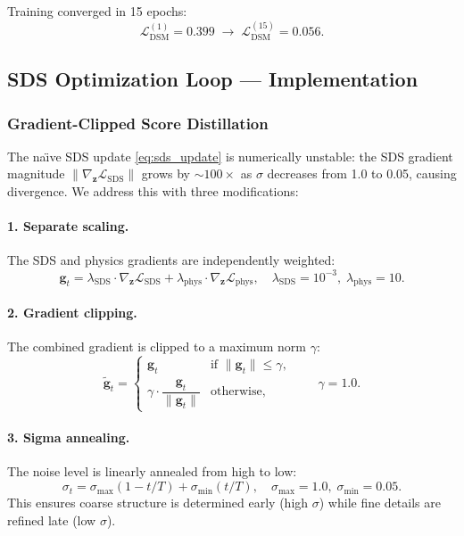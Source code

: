 \documentclass[12pt,a4paper]{article}
\newcommand{\loss}{\mathcal{L}}
\newcommand{\zvec}{\bm{z}}
\theoremstyle{definition}
\begin{document}
Training converged in 15 epochs:
\begin{equation}
  \loss_{\mathrm{DSM}}^{(1)} = 0.399 \;\to\; \loss_{\mathrm{DSM}}^{(15)} = 0.056.
\end{equation}

\subsection{SDS Optimization Loop — Implementation}

\subsubsection{Gradient-Clipped Score Distillation}

The na\"{\i}ve SDS update \eqref{eq:sds_update} is numerically unstable:
the SDS gradient magnitude $\| \nabla_\zvec \loss_{\mathrm{SDS}} \|$
grows by $\sim\!\!100\times$ as $\sigma$ decreases from 1.0 to 0.05,
causing divergence.  We address this with three modifications:

\paragraph{1. Separate scaling.}
The SDS and physics gradients are independently weighted:
\begin{equation}
  \bm{g}_t = \lambda_{\mathrm{SDS}} \cdot \nabla_\zvec \loss_{\mathrm{SDS}}
           + \lambda_{\mathrm{phys}} \cdot \nabla_\zvec \loss_{\mathrm{phys}},
  \quad \lambda_{\mathrm{SDS}} = 10^{-3},\; \lambda_{\mathrm{phys}} = 10.
  \label{eq:separate_scaling}
\end{equation}

\paragraph{2. Gradient clipping.}
The combined gradient is clipped to a maximum norm $\gamma$:
\begin{equation}
  \tilde{\bm{g}}_t = \begin{cases}
    \bm{g}_t & \text{if } \|\bm{g}_t\| \le \gamma, \\
    \gamma \cdot \dfrac{\bm{g}_t}{\|\bm{g}_t\|} & \text{otherwise},
  \end{cases}
  \qquad \gamma = 1.0.
  \label{eq:grad_clip}
\end{equation}

\paragraph{3. Sigma annealing.}
The noise level is linearly annealed from high to low:
\begin{equation}
  \sigma_t = \sigma_{\max}(1 - t/T) + \sigma_{\min}(t/T),
  \quad \sigma_{\max} = 1.0,\; \sigma_{\min} = 0.05.
  \label{eq:sigma_anneal}
\end{equation}
This ensures coarse structure is determined early (high $\sigma$) while
fine details are refined late (low $\sigma$).
\end{document}
